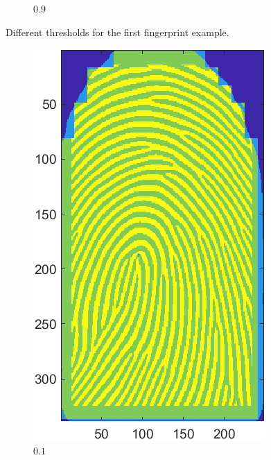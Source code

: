 \documentclass[a4paper]{article}
\begin{document}
\begin{figure}[H]
\begin{subfigure}[t]{0.2\textwidth}
      \caption{\(0.9\)}
  \end{subfigure}
    \caption{Different thresholds for the first fingerprint example.}
    \label{fig:ex4-1st}
\end{figure}

\begin{figure}[H]
  \centering
       \begin{subfigure}[t]{0.2\textwidth}
         \centering
         \includegraphics[scale=0.5]{Figures/E4-e2-0.1}
         \caption{\(0.1\)}
     \end{subfigure}%
     \quad
     \begin{subfigure}[t]{0.2\textwidth}
         \centering

\end{subfigure}
\end{figure}
\end{document}
